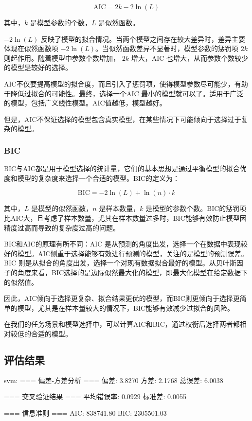 \documentclass[11pt,a4paper]{article}
\begin{document}
\[
\text{AIC} = 2k - 2\ln(L)
\]

其中，\( k \) 是模型参数的个数，\( L \) 是似然函数。

\(-2\ln(L)\) 反映了模型的拟合情况。当两个模型之间存在较大差异时，差异主要体现在似然函数项 \(-2\ln(L)\)。当似然函数差异不显著时，模型参数的惩罚项 \( 2k \) 则起作用。随着模型中参数个数增加， \( 2k \) 增大，AIC 也增大，从而参数个数较少的模型是较好的选择。

AIC不仅要提高模型的拟合度，而且引入了惩罚项，使得模型参数尽可能少，有助于降低过拟合的可能性。最终，选择一个AIC 最小的模型就可以了。适用于广泛的模型，包括广义线性模型。AIC值越低，模型越好。

但是，AIC不保证选择的模型包含真实模型，在某些情况下可能倾向于选择过于复杂的模型。

\subsubsection{BIC}

BIC与AIC都是用于模型选择的统计量，它们的基本思想是通过平衡模型的拟合优度和模型的复杂度来选择一个合适的模型。BIC的定义为：

\[
\text{BIC} = -2 \ln(L) + \ln(n) \cdot k
\]

其中，\( L \) 是模型的似然函数，\( n \) 是样本数量，\( k \) 是模型的参数个数。BIC的惩罚项比AIC大，且考虑了样本数量，尤其在样本数量过多时，BIC能够有效防止模型因精度过高而导致的复杂度过高的问题。

BIC和AIC的原理有所不同：AIC 是从预测的角度出发，选择一个在数据中表现较好的模型。AIC侧重于选择能够有效进行预测的模型，关注的是模型的预测误差。BIC 则是从拟合的角度出发，选择一个对现有数据拟合最好的模型。从贝叶斯因子的角度来看，BIC选择的是边际似然最大化的模型，即最大化模型在给定数据下的似然值。

因此，AIC倾向于选择更复杂、拟合结果更优的模型，而BIC则更倾向于选择更简单的模型，尤其是在样本量较大的情况下，BIC能够有效减少过拟合的风险。

在我们的任务场景和模型选择中，可以计算AIC和BIC，通过权衡后选择两者都相对较低的合适的模型。

\subsection{评估结果}
svm:
=== 偏差-方差分析 ===
偏差: 3.8270
方差: 2.1768
总误差: 6.0038

=== 交叉验证结果 ===
平均错误率: 0.0929
标准差: 0.0055

=== 信息准则 ===
AIC: 838741.80
BIC: 2305501.03
\end{document}
